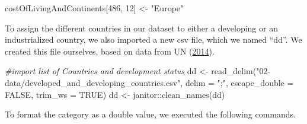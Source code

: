 \documentclass[
  11pt,
  a4paper,
  twoside]{scrbook}
\newenvironment{Shaded}{\begin{snugshade}}{\end{snugshade}}
\newcommand{\AttributeTok}[1]{\textcolor[rgb]{0.77,0.63,0.00}{#1}}
\newcommand{\CommentTok}[1]{\textcolor[rgb]{0.56,0.35,0.01}{\textit{#1}}}
\newcommand{\ConstantTok}[1]{\textcolor[rgb]{0.00,0.00,0.00}{#1}}
\newcommand{\DecValTok}[1]{\textcolor[rgb]{0.00,0.00,0.81}{#1}}
\newcommand{\FloatTok}[1]{\textcolor[rgb]{0.00,0.00,0.81}{#1}}
\newcommand{\FunctionTok}[1]{\textcolor[rgb]{0.00,0.00,0.00}{#1}}
\newcommand{\NormalTok}[1]{#1}
\newcommand{\OtherTok}[1]{\textcolor[rgb]{0.56,0.35,0.01}{#1}}
\newcommand{\SpecialCharTok}[1]{\textcolor[rgb]{0.00,0.00,0.00}{#1}}
\newcommand{\StringTok}[1]{\textcolor[rgb]{0.31,0.60,0.02}{#1}}
\begin{document}
\linespread{1}

\begin{Shaded}
\begin{Highlighting}[]
\NormalTok{costOfLivingAndContinents[}\DecValTok{486}\NormalTok{, }\DecValTok{12}\NormalTok{] }\OtherTok{\textless{}{-}} \StringTok{"Europe"}
\end{Highlighting}
\end{Shaded}

\linespread{1}

To assign the different countries in our dataset to either a developing or an industrialized country, we also imported a new csv file, which we named ``dd''.
We created this file ourselves, based on data from UN (\protect\hyperlink{ref-ddcountries}{2014}).

\linespread{1}

\begin{Shaded}
\begin{Highlighting}[]
\CommentTok{\#import list of Countries and development status}
\NormalTok{dd }\OtherTok{\textless{}{-}} \FunctionTok{read\_delim}\NormalTok{(}\StringTok{"02{-}data/developed\_and\_developing\_countries.csv"}\NormalTok{,}
                 \AttributeTok{delim =} \StringTok{";"}\NormalTok{, }\AttributeTok{escape\_double =} \ConstantTok{FALSE}\NormalTok{,}
                 \AttributeTok{trim\_ws =} \ConstantTok{TRUE}\NormalTok{)}
\NormalTok{dd }\OtherTok{\textless{}{-}}\NormalTok{ janitor}\SpecialCharTok{::}\FunctionTok{clean\_names}\NormalTok{(dd)}
\end{Highlighting}
\end{Shaded}

\linespread{1}

To format the category as a double value, we executed the following commands.

\linespread{1}

\begin{Shaded}
\end{Shaded}
\end{document}
